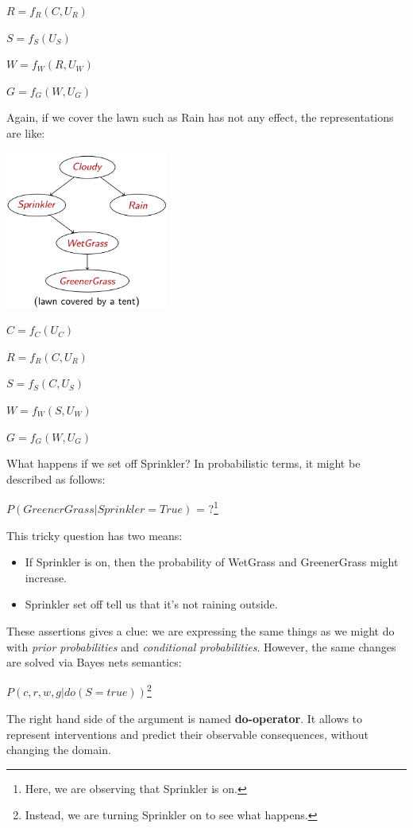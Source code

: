 \begin{example}
    $R = f_R(C, U_R)$

    $S = f_S(U_S)$

    $W = f_W(R, U_W)$

    $G = f_G(W, U_G)$ \vspace{3.5pt}

    Again, if we cover the lawn such as Rain has not any effect, the representations are like: \vspace{3.5pt}
    \begin{center} 
        \includegraphics[width=0.4\textwidth]{img/img10.png}
    \end{center} \vspace{3.5pt}
    $C = f_C(U_C)$

    $R = f_R(C, U_R)$

    $S = f_S(C, U_S)$

    $W = f_W(S, U_W)$

    $G = f_G(W, U_G)$ \vspace{3.5pt}

    What happens if we set off Sprinkler? In probabilistic terms, it might be described as follows:
    \begin{center}
        $P(GreenerGrass|Sprinkler=True)$ = ?\footnote{Here, we are observing that Sprinkler is on.}
    \end{center} \vspace{3.5pt}

    This tricky question has two means: 
    \begin{itemize}
        \renewcommand{\labelitemi}{-}
        \item If Sprinkler is on, then the probability of WetGrass and GreenerGrass might increase.
        \item Sprinkler set off tell us that it's not raining outside. 
    \end{itemize} \vspace{3.5pt}

    These assertions gives a clue: we are expressing the same things as we might do with \textit{prior probabilities} and \textit{conditional probabilities}. However,
    the same changes are solved via Bayes nets semantics:
    \begin{center}
        $P(c, r, w, g|do(S = true))$\footnote{Instead, we are turning Sprinkler on to see what happens.}
    \end{center} \vspace{3.5pt}

    The right hand side of the argument is named \textbf{do-operator}. It allows to represent interventions and predict their observable consequences, without changing the domain.
\end{example}
